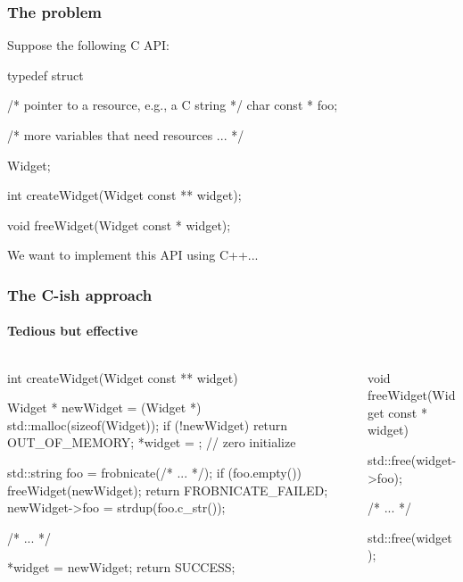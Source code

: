 \documentclass{beamer}
\begin{document}
\begin{frame}[fragile]
\frametitle{The problem}
Suppose the following C API:

\begin{C++}
typedef struct
{
    /* pointer to a resource, e.g., a C string */
    char const * foo;

    /* more variables that need resources ... */
    
} Widget;

int createWidget(Widget const ** widget);

void freeWidget(Widget const * widget);
\end{C++}

We want to implement this API using C++...
\end{frame}


\begin{frame}[fragile]
\frametitle{The C-ish approach}
\framesubtitle{Tedious but effective}
\begin{columns}
\begin{column}{0.45\textwidth}
\begin{TinyC++}
int createWidget(Widget const ** widget)
{
	Widget * newWidget =
			(Widget *) std::malloc(sizeof(Widget));
	if (!newWidget)
	{
		return OUT_OF_MEMORY;
	}
	*widget = {}; // zero initialize
    
	std::string	foo = frobnicate(/* ... */);
	if (foo.empty())
	{
		freeWidget(newWidget);
		return FROBNICATE_FAILED;
	}
	newWidget->foo = strdup(foo.c_str());
    
	/* ... */
    
	*widget = newWidget;
	return SUCCESS;
}
\end{TinyC++}
\end{column}
\begin{column}{0.45\textwidth}
\begin{TinyC++}
void freeWidget(Widget const * widget)
{
	std::free(widget->foo);
    
	/* ... */
    
	std::free(widget);
}
\end{TinyC++}
\end{column}
\end{columns}
\end{frame}

\end{document}
